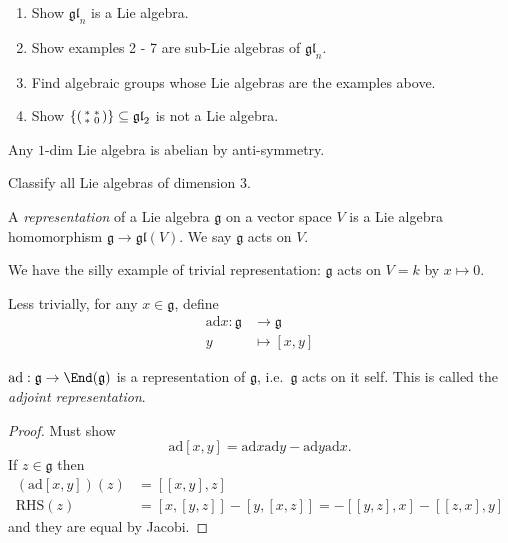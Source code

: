 \documentclass[a4paper]{article}
\newcommand*{\Lie}[1]{\mathfrak{#1}} %
\newcommand{\ad}{\mathrm{ad}} %
\begin{document}
\begin{ex}\leavevmode
  \begin{enumerate}
  \item Show \(\Lie{gl}_n\) is a Lie algebra.
  \item Show examples 2 - 7 are sub-Lie algebras of \(\Lie{gl}_n\).
  \item Find algebraic groups whose Lie algebras are the examples above.
  \item Show \(\{
    \begin{psmallmatrix}
      * & * \\
      * & 0
    \end{psmallmatrix}
    \} \subseteq \Lie{gl}_2\) is not a Lie algebra.
  \end{enumerate}
\end{ex}

\begin{eg}
  Any \(1\)-dim Lie algebra is abelian by anti-symmetry.
\end{eg}

\begin{ex}
  Classify all Lie algebras of dimension \(3\).
\end{ex}

\begin{definition}[representation]
  A \emph{representation} of a Lie algebra \(\Lie g\) on a vector space \(V\) is a Lie algebra homomorphism \(\Lie g \to \Lie{gl}(V)\). We say \(\Lie g\) acts on \(V\).
\end{definition}

We have the silly example of trivial representation: \(\Lie g\) acts on \(V = k\) by \(x \mapsto 0\).

Less trivially, for any \(x \in \Lie g\), define
\begin{align*}
  \ad x: \Lie g &\to \Lie g \\
  y &\mapsto [x, y]
\end{align*}

\begin{lemma}
  \(\ad: \Lie g \to \End(\Lie g)\) is a representation of \(\Lie g\), i.e.\ \(\Lie g\) acts on it self. This is called the \emph{adjoint representation}.
\end{lemma}

\begin{proof}
  Must show
  \[
    \ad [x, y] = \ad x \ad y - \ad y \ad x.
  \]
  If \(z \in \Lie g\) then
  \begin{align*}
    (\ad [x, y])(z) &= [[x, y], z] \\
    \text{RHS}(z) &= [x, [y, z]] - [y, [x, z]] = -[[y, z], x] - [[z, x], y]
  \end{align*}
  and they are equal by Jacobi.
\end{proof}
\end{document}
